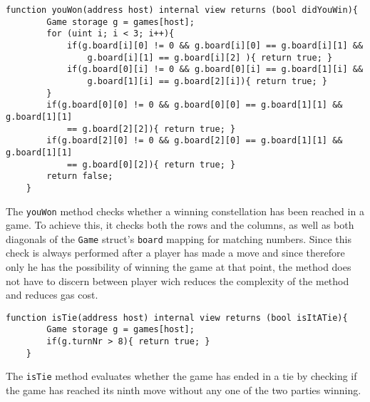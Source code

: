 \documentclass[10pt]{article}
\begin{document}
\begin{Verbatim}[fontsize=\small]
    function youWon(address host) internal view returns (bool didYouWin){
        Game storage g = games[host];
        for (uint i; i < 3; i++){
            if(g.board[i][0] != 0 && g.board[i][0] == g.board[i][1] && 
            	g.board[i][1] == g.board[i][2] ){ return true; }
            if(g.board[0][i] != 0 && g.board[0][i] == g.board[1][i] && 
            	g.board[1][i] == g.board[2][i]){ return true; }
        }
        if(g.board[0][0] != 0 && g.board[0][0] == g.board[1][1] && g.board[1][1]
        	== g.board[2][2]){ return true; }
        if(g.board[2][0] != 0 && g.board[2][0] == g.board[1][1] && g.board[1][1] 
        	== g.board[0][2]){ return true; }
        return false;
    }
\end{Verbatim}
The \texttt{youWon} method checks whether a winning constellation has been reached in a game. To achieve this, it checks both the rows and the columns, as well as both diagonals of the \texttt{Game} struct's \texttt{board} mapping for matching numbers. Since this check is always performed after a player has made a move and since therefore only he has the possibility of winning the game at that point, the method does not have to discern between player wich reduces the complexity of the method and reduces gas cost.
\begin{Verbatim}[fontsize=\small]
    function isTie(address host) internal view returns (bool isItATie){
        Game storage g = games[host];
        if(g.turnNr > 8){ return true; }
    }
\end{Verbatim}
The \texttt{isTie} method evaluates whether the game has ended in a tie by checking if the game has reached its ninth move without any one of the two parties winning.
\end{document}
